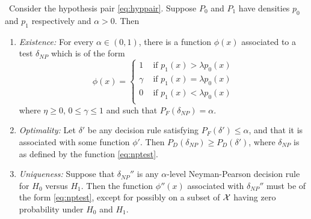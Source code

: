 \begin{lemma}\
Consider the hypothesis pair \ref{eq:hyppair}. Suppose $P_0$ and $P_1$ have densities $p_0$ and $p_1$ respectively and $\alpha>0$. Then
\begin{enumerate}
\item \textit{Existence:} For every $\alpha \in (0,1)$, there is a function  $\phi(x)$ associated to a test $\delta_{NP}$ which is of the form 
\begin{equation}
\label{eq:nptest}
\phi(x)=\left\{ 
\begin{array}{ll}
1 & \mbox{ if } p_1(x) > \lambda p_0(x) \\
\gamma & \mbox{ if } p_1(x) = \lambda p_0(x) \\
0 & \mbox{ if } p_1(x) < \lambda p_0(x) \\
\end{array}
\right.
\end{equation}
where $\eta\geq 0$, $0\leq \gamma \leq 1$ and such that $P_F(\delta_{NP})=\alpha$.
\item \textit{Optimality:} Let $\delta'$ be any decision rule satisfying $P_F(\delta')\leq \alpha$, and that it is associated with some function $\phi'$. Then $P_D(\delta_{NP}) \geq P_D(\delta')$, where $\delta_{NP}$ is as defined by the function \ref{eq:nptest}.
\item \textit{Uniqueness:} Suppose that $\delta_{NP}''$ is any $\alpha$-level Neyman-Pearson decision rule for $H_0$ versus $H_1$. Then the function $\phi''(x)$ associated with $\delta_{NP}''$ must be of the form \ref{eq:nptest}, except for possibly on a subset of $\mathcal{X}$ having zero probability under $H_0$ and $H_1$.
\end{enumerate}

\end{lemma}

